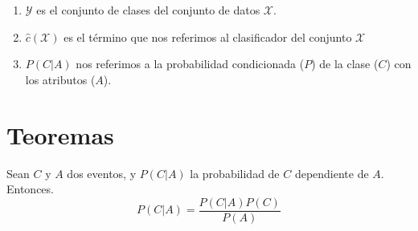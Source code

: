 


\begin{enumerate}
    \item $\mathcal{Y}$ es el conjunto de clases del conjunto de datos $\mathcal{X}$.
    \item $\hat{c}(\mathcal{X})$ es el término que nos referimos al clasificador del conjunto $\mathcal{X}$
    \item $P(C|A)$ nos referimos a la probabilidad condicionada ($P$) de la clase ($C$) con los atributos ($A$).
\end{enumerate}


\chapter*{Teoremas}


\begin{theorem}[Bayes]
    \label{theorem:bayes}
    Sean $C$ y $A$ dos eventos, y $P(C|A)$ la probabilidad de $C$ dependiente de $A$. Entonces.
    \[ P(C|A) = \frac{P(C|A) P(C)}{P(A)} \]
\end{theorem}